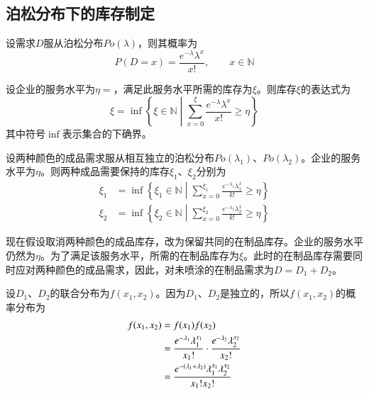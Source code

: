 \subsection{泊松分布下的库存制定}

设需求$D$服从泊松分布$Po(\lambda)$，则其概率为
\[
P(D=x) = \frac{e^{-\lambda}\lambda^x}{x!},\qquad x\in\mathbb{N}
\]

设企业的服务水平为$\eta=$，满足此服务水平所需的库存为$\xi$。则库存$\xi$的表达式为
\begin{equation}
\xi = \inf\left\{\xi\in\mathbb{N}\middle|\sum_{x=0}^{\xi}\frac{e^{-\lambda}\lambda^x}{x!}\geq \eta\right\}
\end{equation}
其中符号$\inf$表示集合的下确界。

设两种颜色的成品需求服从相互独立的泊松分布$Po(\lambda_1)$、$Po(\lambda_2)$。企业的服务水平为$\eta$。则两种成品需要保持的库存$\xi_1$、$\xi_2$分别为
\begin{align}
\xi_1 &= \inf\left\{\xi_1\in\mathbb{N}\middle|\sum_{x=0}^{\xi_1}\frac{e^{-\lambda_1}\lambda_1^x}{k!}\geq \eta\right\} \label{eq:成品库存_泊松1}\\
\xi_2 &= \inf\left\{\xi_2\in\mathbb{N}\middle|\sum_{x=0}^{\xi_2}\frac{e^{-\lambda_2}\lambda_2^x}{k!}\geq \eta\right\} \label{eq:成品库存_泊松2}
\end{align}

现在假设取消两种颜色的成品库存，改为保留共同的在制品库存。企业的服务水平仍然为$\eta$。为了满足该服务水平，所需的在制品库存为$\xi$。此时的在制品库存需要同时应对两种颜色的成品需求，因此，对未喷涂的在制品需求为$D=D_1+D_2$。

设$D_1$、$D_2$的联合分布为$f(x_1,x_2)$。因为$D_1$、$D_2$是独立的，所以$f(x_1,x_2)$的概率分布为
\begin{align}
f(x_1,x_2) &= f(x_1)f(x_2) \notag\\
&= \frac{e^{-\lambda_1}\lambda_1^{x_1}}{x_1!} \cdot \frac{e^{-\lambda_2}\lambda_2^{x_2}}{x_2!} \notag\\
&= \frac{e^{-(\lambda_1+\lambda_2)}\lambda_1^{x_1}\lambda_2^{x_2}}{x_1!x_2!}
\label{eq:联合分布_泊松}
\end{align}

